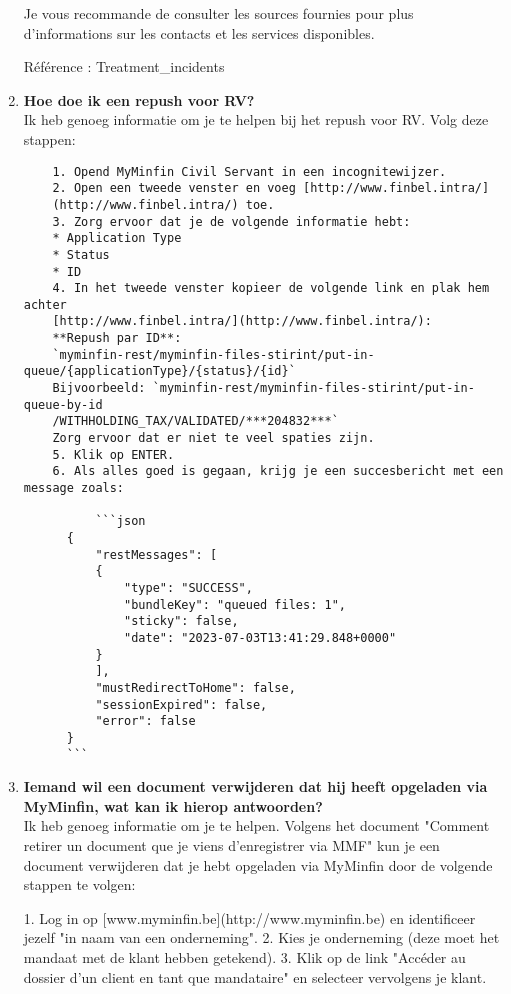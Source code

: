 \begin{enumerate}
    Je vous recommande de consulter les sources fournies pour plus d'informations sur les contacts et les services disponibles.
    
    Référence : Treatment\_incidents
    
    
    \item \textbf{Hoe doe ik een repush voor RV?} \\
    
    Ik heb genoeg informatie om je te helpen bij het repush voor RV. Volg deze stappen:
    \begin{verbatim}
    1. Opend MyMinfin Civil Servant in een incognitewijzer.
    2. Open een tweede venster en voeg [http://www.finbel.intra/]
    (http://www.finbel.intra/) toe.
    3. Zorg ervoor dat je de volgende informatie hebt:
    * Application Type
    * Status
    * ID
    4. In het tweede venster kopieer de volgende link en plak hem achter 
    [http://www.finbel.intra/](http://www.finbel.intra/):
    **Repush par ID**:
    `myminfin-rest/myminfin-files-stirint/put-in-queue/{applicationType}/{status}/{id}`
    Bijvoorbeeld: `myminfin-rest/myminfin-files-stirint/put-in-queue-by-id
    /WITHHOLDING_TAX/VALIDATED/***204832***`
    Zorg ervoor dat er niet te veel spaties zijn.
    5. Klik op ENTER.
    6. Als alles goed is gegaan, krijg je een succesbericht met een message zoals:
    
          ```json
      {
          "restMessages": [
          {
              "type": "SUCCESS",
              "bundleKey": "queued files: 1",
              "sticky": false,
              "date": "2023-07-03T13:41:29.848+0000"
          }
          ],
          "mustRedirectToHome": false,
          "sessionExpired": false,
          "error": false
      }
      ```
    \end{verbatim}
    
    \item \textbf{Iemand wil een document verwijderen dat hij heeft opgeladen via MyMinfin, wat kan ik hierop antwoorden?} \\
    Ik heb genoeg informatie om je te helpen. Volgens het document "Comment retirer un document que je viens d'enregistrer via MMF" kun je een document verwijderen dat je hebt opgeladen via MyMinfin door de volgende stappen te volgen:
    
    1. Log in op [www.myminfin.be](http://www.myminfin.be) en identificeer jezelf "in naam van een onderneming".
    2. Kies je onderneming (deze moet het mandaat met de klant hebben getekend).
    3. Klik op de link "Accéder au dossier d'un client en tant que mandataire" en selecteer vervolgens je klant.
    

\end{enumerate}

